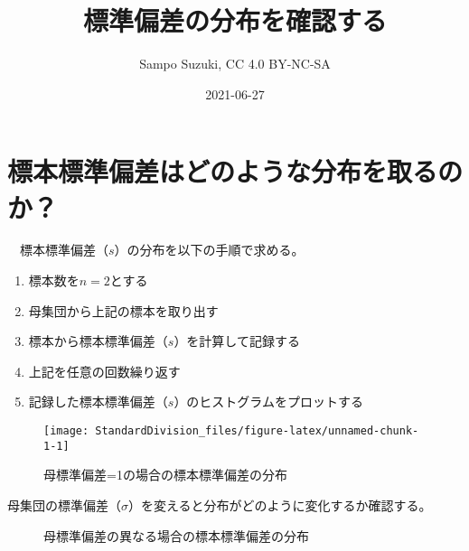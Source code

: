 \documentclass[]{tufte-handout}
\title[標本標準偏差は正規分布するのか？]{標準偏差の分布を確認する}
\author{Sampo Suzuki, CC 4.0 BY-NC-SA}
\date{2021-06-27}
\providecommand{\tightlist}{%
  \setlength{\itemsep}{0pt}\setlength{\parskip}{0pt}}
\begin{document}
\maketitle




\hypertarget{ux6a19ux672cux6a19ux6e96ux504fux5deeux306fux3069ux306eux3088ux3046ux306aux5206ux5e03ux3092ux53d6ux308bux306eux304b}{%
\section{標本標準偏差はどのような分布を取るのか？}\label{ux6a19ux672cux6a19ux6e96ux504fux5deeux306fux3069ux306eux3088ux3046ux306aux5206ux5e03ux3092ux53d6ux308bux306eux304b}}

　標本標準偏差（\(s\)）の分布を以下の手順で求める。

\begin{enumerate}
\def\labelenumi{\arabic{enumi}.}
\tightlist
\item
  標本数を\(n = 2\)とする
\item
  母集団から上記の標本を取り出す
\item
  標本から標本標準偏差（\(s\)）を計算して記録する
\item
  上記を任意の回数繰り返す
\item
  記録した標本標準偏差（\(s\)）のヒストグラムをプロットする
\end{enumerate}

\begin{figure}

{\centering \texttt{[image: StandardDivision\_files/figure-latex/unnamed-chunk-1-1]} 

}

\caption[母標準偏差=1の場合の標本標準偏差の分布]{母標準偏差=1の場合の標本標準偏差の分布}\label{fig:unnamed-chunk-1}
\end{figure}

母集団の標準偏差（\(\sigma\)）を変えると分布がどのように変化するか確認する。

\begin{figure}

{\centering {}

}

\caption[母標準偏差の異なる場合の標本標準偏差の分布]{母標準偏差の異なる場合の標本標準偏差の分布}\label{fig:unnamed-chunk-2}
\end{figure}
\end{document}
